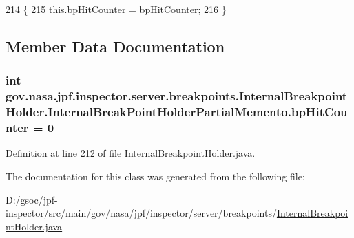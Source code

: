 \begin{DoxyCode}
214                                                                      \{
215       this.\hyperlink{classgov_1_1nasa_1_1jpf_1_1inspector_1_1server_1_1breakpoints_1_1_internal_breakpoint_holder_1_13ca7fc5bb2b7ecd1495c4d5e8a0f1a71_ab3b2affd621a464b7e52ffb0be11f3ac}{bpHitCounter} = \hyperlink{classgov_1_1nasa_1_1jpf_1_1inspector_1_1server_1_1breakpoints_1_1_internal_breakpoint_holder_1_13ca7fc5bb2b7ecd1495c4d5e8a0f1a71_ab3b2affd621a464b7e52ffb0be11f3ac}{bpHitCounter};
216     \}
\end{DoxyCode}


\subsection{Member Data Documentation}
\subsubsection[{\texorpdfstring{bp\+Hit\+Counter}{bpHitCounter}}]{\setlength{\rightskip}{0pt plus 5cm}int gov.\+nasa.\+jpf.\+inspector.\+server.\+breakpoints.\+Internal\+Breakpoint\+Holder.\+Internal\+Break\+Point\+Holder\+Partial\+Memento.\+bp\+Hit\+Counter = 0\hspace{0.3cm}{\ttfamily [private]}}\hypertarget{classgov_1_1nasa_1_1jpf_1_1inspector_1_1server_1_1breakpoints_1_1_internal_breakpoint_holder_1_13ca7fc5bb2b7ecd1495c4d5e8a0f1a71_ab3b2affd621a464b7e52ffb0be11f3ac}{}\label{classgov_1_1nasa_1_1jpf_1_1inspector_1_1server_1_1breakpoints_1_1_internal_breakpoint_holder_1_13ca7fc5bb2b7ecd1495c4d5e8a0f1a71_ab3b2affd621a464b7e52ffb0be11f3ac}


Definition at line 212 of file Internal\+Breakpoint\+Holder.\+java.



The documentation for this class was generated from the following file\+:\begin{DoxyCompactItemize}
\item 
D\+:/gsoc/jpf-\/inspector/src/main/gov/nasa/jpf/inspector/server/breakpoints/\hyperlink{_internal_breakpoint_holder_8java}{Internal\+Breakpoint\+Holder.\+java}\end{DoxyCompactItemize}
